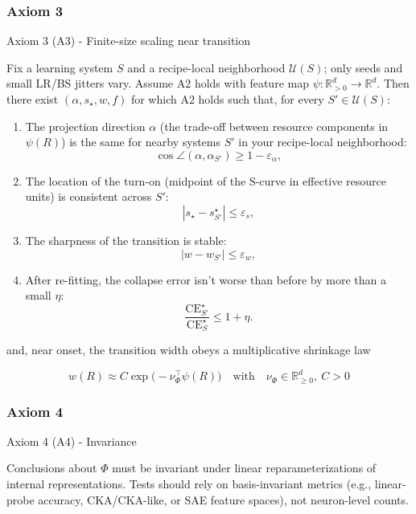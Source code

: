 \documentclass[12pt]{article}
\begin{document}
\subsubsection{Axiom 3}

\begin{statementbox}{Axiom 3 (A3) - Finite-size scaling near transition}

Fix a learning system $S$ and a recipe-local neighborhood $\mathcal U(S)$; only seeds and small LR/BS jitters vary. Assume A2 holds with feature map $ \psi:\mathbb R^d_{>0}\!\to\mathbb R^d$. Then there exist $(\alpha, s_\star, w, f)$ for which A2 holds such that, for every $S'\in\mathcal U(S)$:

\begin{enumerate}[label=\roman*.]
    \item The projection direction $ \alpha$ (the trade-off between resource components in $\psi(R)$) is the same for nearby systems $S'$ in your recipe-local neighborhood:
    \[
    \cos\angle(\alpha,\alpha_{S'}) \ge 1-\varepsilon_\alpha,
    \]
    \item The location of the turn-on (midpoint of the S-curve in effective resource units) is consistent across $S'$:
    \[
    |s_\star - s^\star_{S'}| \le \varepsilon_{s},
    \]
    \item The sharpness of the transition is stable:
    \[
    |w - w_{S'}| \le \varepsilon_{w},
    \]
    \item After re-fitting, the collapse error isn’t worse than before by more than a small $\eta$:
    \[
    \frac{\mathrm{CE}^\star_{S'}}{\mathrm{CE}^\star_{S}} \le 1+\eta.
    \]
\end{enumerate}

and, near onset, the transition width obeys a multiplicative shrinkage law

\[
w(R)\approx C\exp\big(-\nu_\Phi^\top \psi(R)\big)
\quad\text{with}\quad \nu_\Phi\in\mathbb R^d_{\ge 0},\ C>0
\]

\end{statementbox}

\subsubsection{Axiom 4}

\begin{statementbox}{Axiom 4 (A4) - Invariance}

Conclusions about $\Phi$ must be invariant under linear reparameterizations of internal representations. Tests should rely on basis-invariant metrics (e.g., linear-probe accuracy, CKA/CKA-like, or SAE feature spaces), not neuron-level counts.

\end{statementbox}
\end{document}
